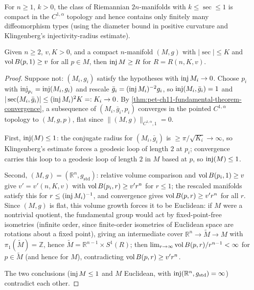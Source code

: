 \begin{corollary}
  \label{cor:pet-ch11-cheeger-even-dim-finiteness}
  For $n\ge1$, $k>0$, the class of Riemannian $2n$-manifolds with
  $k\le\sec\le1$ is compact in the $C^{1,\alpha}$ topology and hence contains
  only finitely many diffeomorphism types (using the diameter bound in
  positive curvature and Klingenberg's injectivity-radius estimate).
\end{corollary}

\begin{lemma}
  \label{lem:pet-ch11-cheeger-injectivity-radius-lemma}
  Given $n\ge2$, $v,K>0$, and a compact $n$-manifold $(M,g)$ with
  $|\sec|\le K$ and $\operatorname{vol} B(p,1)\ge v$ for all $p\in M$, then $\operatorname{inj} M\ge R$
  for $R=R(n,K,v)$.
\end{lemma}
\begin{proof}
  Suppose not: $(M_i,g_i)$ satisfy the hypotheses with $\operatorname{inj} M_i\to0$. Choose
  $p_i$ with $\operatorname{inj}_{p_i}=\operatorname{inj}(M_i,g_i)$ and rescale
  $\bar g_i=(\operatorname{inj} M_i)^{-2}g_i$, so $\operatorname{inj}(M_i,\bar g_i)=1$ and
  $|\operatorname{sec}(M_i,\bar g_i)|\le(\operatorname{inj} M_i)^2K=:K_i\to0$. By
  \cref{thm:pet-ch11-fundamental-theorem-convergence}, a subsequence of
  $(M_i,\bar g_i,p_i)$ converges in the pointed $C^{1,\alpha}$ topology to
  $(M,g,p)$, flat since $\|(M,g)\|_{C^{1,\alpha},1}=0$.

  First, $\operatorname{inj}(M)\le1$: the conjugate radius for $(M_i,\bar g_i)$ is
  $\ge\pi/\sqrt{K_i}\to\infty$, so Klingenberg's estimate forces a geodesic
  loop of length $2$ at $p_i$; convergence carries this loop to a geodesic
  loop of length $2$ in $M$ based at $p$, so $\operatorname{inj}(M)\le1$.

  Second, $(M,g)=(\mathbb{R}^n,g_{\mathrm{std}})$: relative volume comparison and
  $\operatorname{vol} B(p_i,1)\ge v$ give $v'=v'(n,K,v)$ with
  $\operatorname{vol} B(p_i,r)\ge v'r^n$ for $r\le1$; the rescaled manifolds satisfy this
  for $r\le(\operatorname{inj} M_i)^{-1}$, and convergence gives $\operatorname{vol} B(p,r)\ge v'r^n$ for
  all $r$. Since $(M,g)$ is flat, this volume growth forces it to be
  Euclidean: if $M$ were a nontrivial quotient, the fundamental group would
  act by fixed-point-free isometries (infinite order, since finite-order
  isometries of Euclidean space are rotations about a fixed point), giving an
  intermediate cover $\mathbb{R}^n\to\tilde M\to M$ with $\pi_1(\tilde M)=\mathbb{Z}$,
  hence $\tilde M=\mathbb{R}^{n-1}\times S^1(R)$; then
  $\lim_{r\to\infty}\operatorname{vol} B(p,r)/r^{n-1}<\infty$ for $p\in\tilde M$ (and hence
  for $M$), contradicting $\operatorname{vol} B(p,r)\ge v'r^n$.

  The two conclusions ($\operatorname{inj} M\le1$ and $M$ Euclidean, with
  $\operatorname{inj}(\mathbb{R}^n,g_{\mathrm{std}})=\infty$) contradict each other.
\end{proof}

